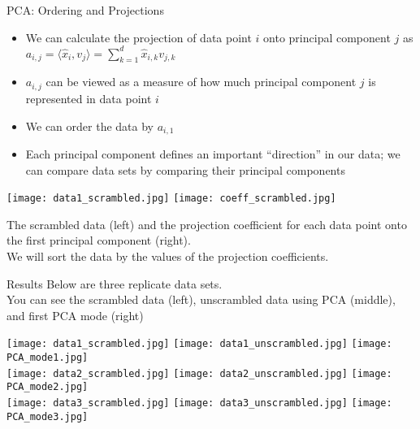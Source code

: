 \documentclass{beamer}
\begin{document}
\begin{frame}{PCA: Ordering and Projections}
    \begin{itemize}
        \item We can calculate the projection of data point $i$ onto principal component $j$ as $a_{i,j} = \langle \hat{x}_i, v_j \rangle = \sum_{k=1}^{d} \hat{x}_{i,k} v_{j,k}$
        \item $a_{i,j}$ can be viewed as a measure of how much principal component $j$ is represented in data point $i$
        \item We can order the data by $a_{i,1}$
        \item Each principal component defines an important ``direction'' in our data; we can compare data sets by comparing their principal components
    \end{itemize}

    \centering
    \texttt{[image: data1\_scrambled.jpg]}
    \texttt{[image: coeff\_scrambled.jpg]}\\
    {\Tiny The scrambled data (left) and the projection coefficient for each data point onto the first principal component (right).\\
    We will sort the data by the values of the projection coefficients. \par}

\end{frame}

\begin{frame}{Results}
  \centering
    Below are three replicate data sets.\\
    You can see the scrambled data (left), unscrambled data using PCA (middle), and first PCA mode (right)

    \texttt{[image: data1\_scrambled.jpg]}
    \texttt{[image: data1\_unscrambled.jpg]}
    \texttt{[image: PCA\_mode1.jpg]}\\
    \texttt{[image: data2\_scrambled.jpg]}
    \texttt{[image: data2\_unscrambled.jpg]}
    \texttt{[image: PCA\_mode2.jpg]}\\
    \texttt{[image: data3\_scrambled.jpg]}
    \texttt{[image: data3\_unscrambled.jpg]}
    \texttt{[image: PCA\_mode3.jpg]}

\end{frame}
\end{document}
